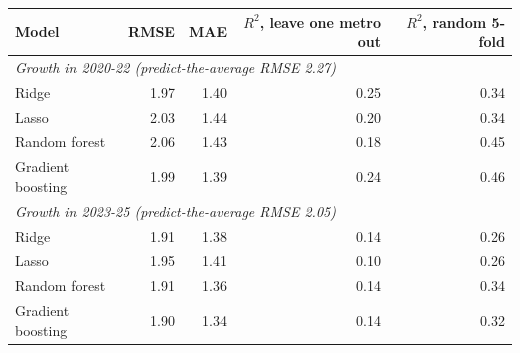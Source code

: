 \footnotesize\setlength{\tabcolsep}{4pt}
\begin{tabular}{lrrrr}
\toprule
Model & RMSE & MAE & \shortstack[r]{$R^2$, leave\\one metro out} & \shortstack[r]{$R^2$, random\\5-fold} \\
\midrule
\multicolumn{5}{l}{\textit{Growth in 2020-22 (predict-the-average RMSE 2.27)}} \\
Ridge & 1.97 & 1.40 & 0.25 & 0.34 \\
Lasso & 2.03 & 1.44 & 0.20 & 0.34 \\
Random forest & 2.06 & 1.43 & 0.18 & 0.45 \\
Gradient boosting & 1.99 & 1.39 & 0.24 & 0.46 \\
\multicolumn{5}{l}{\textit{Growth in 2023-25 (predict-the-average RMSE 2.05)}} \\
Ridge & 1.91 & 1.38 & 0.14 & 0.26 \\
Lasso & 1.95 & 1.41 & 0.10 & 0.26 \\
Random forest & 1.91 & 1.36 & 0.14 & 0.34 \\
Gradient boosting & 1.90 & 1.34 & 0.14 & 0.32 \\
\bottomrule
\end{tabular}
